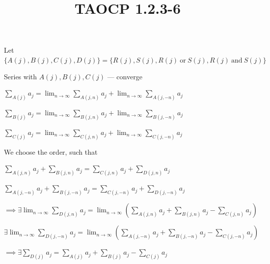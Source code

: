 \documentclass{article}
\title{TAOCP 1.2.3\mbox{-}6}
\begin{document}
\maketitle

Let \( \{ A(j), B(j), C(j), D(j) \} = \{ R(j), S(j), R(j)\ \textrm{or}\ S(j), R(j)\ \textrm{and}\ S(j) \} \)

Series with \( A(j), B(j), C(j) \) --- converge

\( \sum_{A(j)} a_{j} = \lim_{n\to\infty} \sum_{A(j,n)} a_{j} + \lim_{n\to\infty} \sum_{A(j,-n)} a_{j} \)

\( \sum_{B(j)} a_{j} = \lim_{n\to\infty} \sum_{B(j,n)} a_{j} + \lim_{n\to\infty} \sum_{B(j,-n)} a_{j} \)

\( \sum_{C(j)} a_{j} = \lim_{n\to\infty} \sum_{C(j,n)} a_{j} + \lim_{n\to\infty} \sum_{C(j,-n)} a_{j} \)

We choose the order, such that

\( \sum_{A(j,n)} a_{j} + \sum_{B(j,n)} a_{j} = \sum_{C(j,n)} a_{j} + \sum_{D(j,n)} a_{j} \)

\( \sum_{A(j,-n)} a_{j} + \sum_{B(j,-n)} a_{j} = \sum_{C(j,-n)} a_{j} + \sum_{D(j,-n)} a_{j} \)

\( \implies \exists \lim_{n\to\infty} \sum_{D(j,n)} a_{j} = \lim_{n\to\infty}(\sum_{A(j,n)} a_{j} + \sum_{B(j,n)} a_{j} - \sum_{C(j,n)} a_{j}) \)

\( \exists \lim_{n\to\infty} \sum_{D(j,-n)} a_{j} = \lim_{n\to\infty}(\sum_{A(j,-n)} a_{j} + \sum_{B(j,-n)} a_{j} - \sum_{C(j,-n)} a_{j}) \)

\( \implies \exists \sum_{D(j)} a_{j} = \sum_{A(j)} a_{j} + \sum_{B(j)} a_{j} - \sum_{C(j)} a_{j} \)
\end{document}
